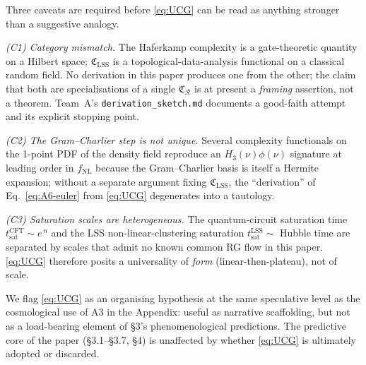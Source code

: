 Three caveats are required before \eqref{eq:UCG} can be read as anything
stronger than a suggestive analogy.

\emph{(C1) Category mismatch.} The Haferkamp complexity is a
gate-theoretic quantity on a Hilbert space; $\mathfrak{C}_{\mathrm{LSS}}$
is a topological-data-analysis functional on a classical random field. No
derivation in this paper produces one from the other; the claim that both
are specialisations of a single $\mathfrak{C}_{\mathcal{R}}$ is at
present a \emph{framing} assertion, not a theorem. Team~A's
\texttt{derivation\_sketch.md} documents a good-faith attempt and its
explicit stopping point.

\emph{(C2) The Gram--Charlier step is not unique.} Several complexity
functionals on the 1-point PDF of the density field reproduce an
$H_3(\nu)\phi(\nu)$ signature at leading order in $f_{\mathrm{NL}}$
because the Gram--Charlier basis is itself a Hermite expansion; without a
separate argument fixing $\mathfrak{C}_{\mathrm{LSS}}$, the
``derivation'' of Eq.~\eqref{eq:A6-euler} from \eqref{eq:UCG} degenerates
into a tautology.

\emph{(C3) Saturation scales are heterogeneous.} The quantum-circuit
saturation time $t_{\mathrm{sat}}^{\mathrm{CFT}} \sim e^{\,n}$ and the
LSS non-linear-clustering saturation $t_{\mathrm{sat}}^{\mathrm{LSS}}
\sim $ Hubble time are separated by scales that admit no known common
RG flow in this paper. \eqref{eq:UCG} therefore posits a universality of
\emph{form} (linear-then-plateau), not of scale.

We flag \eqref{eq:UCG} as an organising hypothesis at the same speculative
level as the cosmological use of A3 in the Appendix: useful as narrative
scaffolding, but not as a load-bearing element of \S3's
phenomenological predictions. The predictive core of the paper
(\S3.1--\S3.7, \S4) is unaffected by whether \eqref{eq:UCG} is
ultimately adopted or discarded.
